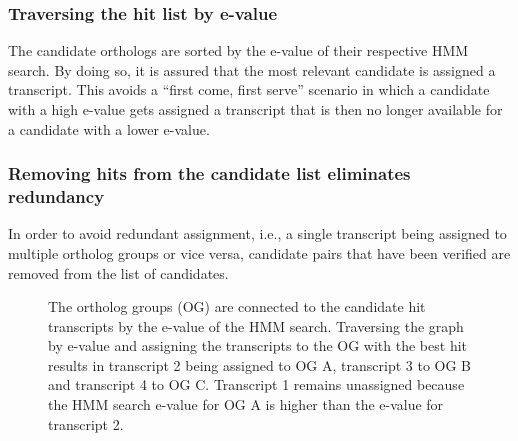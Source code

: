 \subsubsection{Traversing the hit list by e-value}

The candidate orthologs are sorted by the e-value of their respective HMM
search. By doing so, it is assured that the most relevant candidate is assigned
a transcript. This avoids a ``first come, first serve'' scenario in which a
candidate with a high e-value gets assigned a transcript that is then no longer
available for a candidate with a lower e-value.

\subsubsection{Removing hits from the candidate list eliminates redundancy}

In order to avoid redundant assignment, i.e., a single transcript being assigned
to multiple ortholog groups or vice versa, candidate pairs that have been
verified are removed from the list of candidates. 

\begin{figure}[ht]
	\begin{center}
		\def\svgwidth{0.8\textwidth}
		
	\end{center}
	\caption[Non-redundant assignment]{The ortholog groups (OG) are connected to
		the candidate hit transcripts by the e-value of the HMM search. Traversing
		the graph by e-value and assigning the transcripts to the OG with the best
		hit results in transcript 2 being assigned to OG A, transcript 3 to OG B and
		transcript 4 to OG C. Transcript 1 remains unassigned because the HMM search
		e-value for OG A is higher than the e-value for transcript 2.}
	\label{fig:orthograph-graph}
\end{figure}
